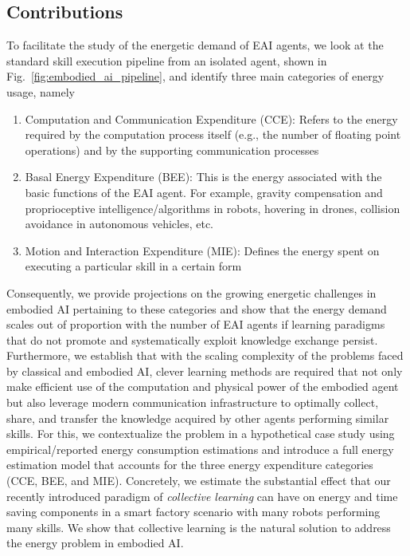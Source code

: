 \subsection{Contributions}
To facilitate the study of the energetic demand of EAI agents, we look at the standard skill execution pipeline from an isolated agent, shown in Fig.~\ref{fig:embodied_ai_pipeline}, and identify three main categories of energy usage, namely
\begin{enumerate}
	\item Computation and Communication Expenditure (CCE): Refers to the energy required by the computation process itself (e.g., the number of floating point operations) and by the supporting communication processes
	\item Basal Energy Expenditure (BEE): This is the energy associated with the basic functions of the EAI agent. For example, gravity compensation and proprioceptive intelligence/algorithms in robots, hovering in drones, collision avoidance in autonomous vehicles, etc.
	\item Motion and Interaction Expenditure (MIE): Defines the energy spent on executing a particular skill in a certain form
\end{enumerate}
Consequently, we provide projections on the growing energetic challenges in embodied AI pertaining to these categories and show that the energy demand scales out of proportion with the number of EAI agents if learning paradigms that do not promote and systematically exploit knowledge exchange persist. Furthermore, we establish that with the scaling complexity of the problems faced by classical and embodied AI, clever learning methods are required that not only make efficient use of the computation and physical power of the embodied agent but also leverage modern communication infrastructure to optimally collect, share, and transfer the knowledge acquired by other agents performing similar skills. For this, we contextualize the problem in a hypothetical case study using empirical/reported energy consumption estimations and introduce a full energy estimation model that accounts for the three energy expenditure categories (CCE, BEE, and MIE). Concretely, we estimate the substantial effect that our recently introduced paradigm of \emph{collective learning} can have on energy and time saving components in a smart factory scenario with many robots performing many skills. We show that collective learning is the natural solution to address the energy problem in embodied AI.

